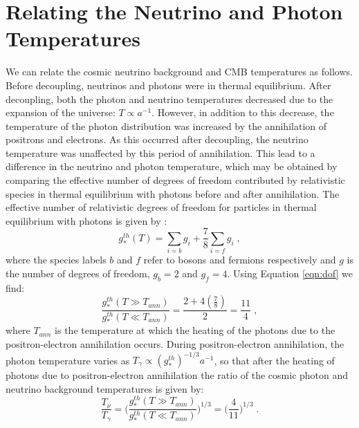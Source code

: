 \documentclass[twocolumn,superscriptaddress,prd]{revtex4}
\begin{document}
\medskip
{}


\appendix

\section{Relating the Neutrino and Photon
  Temperatures}\label{app:AppA}
We can relate the cosmic neutrino background and CMB
temperatures as follows.
Before decoupling, neutrinos and photons were in
thermal equilibrium.  After decoupling, both the photon and neutrino
temperatures decreased due to the expansion of the universe: $T
\propto a^{-1}$. However, in addition to this decrease, the temperature of the
photon distribution was increased by the annihilation of positrons
and electrons. As this occurred after decoupling, the neutrino
temperature was unaffected by this period of annihilation.  
This lead to a difference in the neutrino and
photon temperature, which may be obtained 
 by comparing the effective number of degrees of
freedom contributed by relativistic species in thermal equilibrium
with photons before and after annihilation.  The
effective number of relativistic degrees of freedom for particles in
thermal equilibrium with photons is given by \citep{baumann3}: 
\begin{equation}\label{eqn:dof}
  g_*^{th}(T) = \sum_{i=b} g_i + \frac{7}{8} \sum_{i=f} g_i \;,
\end{equation}
where the species labels $b$ and $f$ refer to bosons and fermions
respectively and $g$ is the number of degrees of freedom, $g_b=2$ and
$g_f=4$.
 Using Equation \eqref{eqn:dof} we find:
\begin{equation}
  \frac{ g_*^{th}(T\gg T_{ann})}{g_*^{th}(T\ll T_{ann})} = \frac{ 2 + 4
    (\frac{7}{8})}{ 2 } = \frac{11}{4} \;,
\end{equation}
where $T_{ann}$ is the temperature at which the heating of the photons
due to the positron-electron annihilation occurs.  
During positron-electron annihilation, the photon
temperature varies as $ T_\gamma \propto (g_*^{th})^{-1/3} a^{-1} $, so that after
the heating of photons due to positron-electron annihilation the ratio
of the cosmic photon and neutrino background temperatures is given by:
\begin{equation}
  \frac{T_\nu}{T_\gamma} = \bigg( \frac{g_*^{th}(  T \gg T_{ann} )}{ g_*^{th}(T
    \ll T_{ann})}   \bigg)^{1/3} =\bigg(\frac{4}{11}\bigg)^{1/3} \;.
\end{equation}
\end{document}
